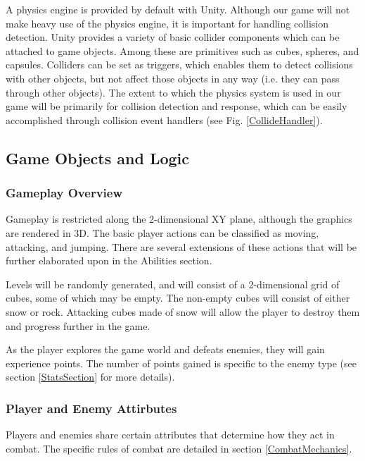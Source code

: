 \documentclass{article}
\begin{document}
A physics engine is provided by default with Unity.  Although our game will not make heavy use of the physics engine, it is important for handling collision detection.  Unity provides a variety of basic collider components which can be attached to game objects.  Among these are primitives such as cubes, spheres, and capsules.  Colliders can be set as triggers, which enables them to detect collisions with other objects, but not affect those objects in any way (i.e. they can pass through other objects).  The extent to which the physics system is used in our game will be primarily for collision detection and response, which can be easily accomplished through collision event handlers (see Fig. \ref{CollideHandler}).

\subsection{Game Objects and Logic}

\subsubsection{Gameplay Overview}

Gameplay is restricted along the 2-dimensional XY plane, although the graphics are rendered in 3D.  The basic player actions can be classified as moving, attacking, and jumping.  There are several extensions of these actions that will be further elaborated upon in the Abilities section.

Levels will be randomly generated, and will consist of a 2-dimensional grid of cubes, some of which may be empty.  The non-empty cubes will consist of either snow or rock.  Attacking cubes made of snow will allow the player to destroy them and progress further in the game.

As the player explores the game world and defeats enemies, they will gain experience points.  The number of points gained is specific to the enemy type (see section \ref{StatsSection} for more details).

\subsubsection{Player and Enemy Attirbutes}

Players and enemies share certain attributes that determine how they act in combat.  The specific rules of combat are detailed in section \ref{CombatMechanics}.
\end{document}
